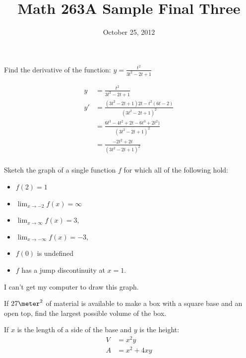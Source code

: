 \documentclass[fleqn,addpoints]{exam}
\title{Math 263A Sample Final Three}
\date{October 25, 2012}
\author{}
\begin{document}

\maketitle  

\begin{questions}

\question Find the derivative of the function: $y = \frac{t^2}{3t^2 - 2t + 1}$
\begin{solution}
\begin{align*}
  y &= \frac{t^2}{3t^2 - 2t + 1} \\
  y' &= \frac{(3t^2 - 2t + 1)2t - t^2(6t - 2)}{(3t^2 - 2t + 1)^2} \\
     &= \frac{6t^3 - 4t^2 + 2t - 6t^3 + 2t^2)}{(3t^2 - 2t + 1)^2} \\
     &= \frac{- 2t^2 + 2t}{(3t^2 - 2t + 1)^2} \\
\end{align*}

\end{solution}

\question Sketch the graph of a single function $f$ for which all of the following hold:
\begin{itemize}
\item $f(2) = 1$
\item $\lim_{x \to -2} f(x) = \infty$
\item $\lim_{x \to \infty} f(x) = 3$,
\item $\lim_{x \to -\infty} f(x) = -3$,
\item $f(0)$ is undefined
\item $f$ has a  jump discontinuity at $x = 1$.
\end{itemize}

\begin{solution}
I can't get my computer to draw this graph.
\end{solution}

\question If $27 \meter^2$ of material is available to make a box with a square base and an open top, find the largest
possible volume of the box.

\begin{solution}
If $x$ is the length of a side of the base and $y$ is the height:
\begin{align*}
  V &= x^2y \\
  A &= x^2 + 4xy \\
\end{align*}


\end{solution}
\end{questions}
\end{document}
